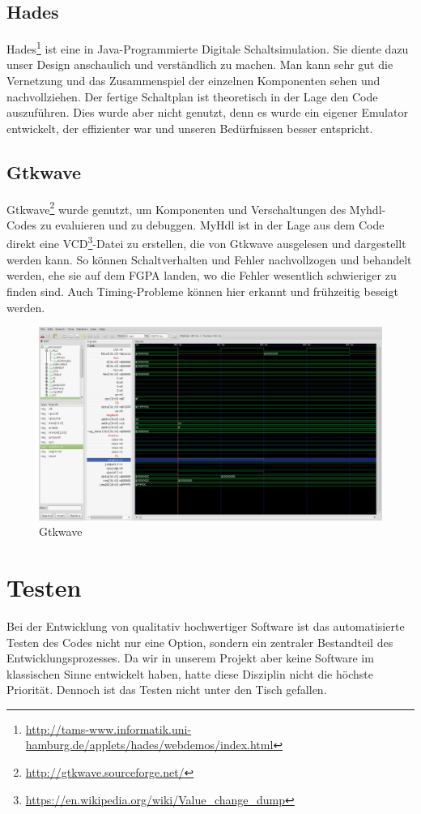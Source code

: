 \subsection{Hades}
Hades\footnote{\url{http://tams-www.informatik.uni-hamburg.de/applets/hades/webdemos/index.html}} ist eine in Java-Programmierte Digitale Schaltsimulation. Sie diente dazu unser Design anschaulich und verständlich zu machen. Man kann sehr gut die Vernetzung und das Zusammenspiel der einzelnen Komponenten sehen und nachvollziehen. Der fertige Schaltplan ist theoretisch in der Lage den Code auszuführen. Dies wurde aber nicht genutzt, denn es wurde ein eigener Emulator entwickelt, der effizienter war und unseren Bedürfnissen besser entspricht.

\subsection{Gtkwave}
Gtkwave\footnote{\url{http://gtkwave.sourceforge.net/}} wurde genutzt, um Komponenten und Verschaltungen des Myhdl-Codes zu evaluieren und zu debuggen. MyHdl ist in der Lage aus dem Code direkt eine VCD\footnote{\url{https://en.wikipedia.org/wiki/Value\_change\_dump}}-Datei zu erstellen, die von Gtkwave ausgelesen und dargestellt werden kann. So können Schaltverhalten und Fehler nachvollzogen und behandelt werden, ehe sie auf dem FGPA landen, wo die Fehler wesentlich schwieriger zu finden sind. Auch Timing-Probleme können hier erkannt und frühzeitig beseigt werden.
\begin{figure}[H]
\centering
\includegraphics[width=\textwidth]{images/gtkwave.png}
\caption{\label{gen:gtkwave}Gtkwave}
\end{figure}

\section{Testen}
Bei der Entwicklung von qualitativ hochwertiger Software ist das automatisierte Testen des Codes nicht nur eine Option, sondern ein zentraler Bestandteil des Entwicklungsprozesses. Da wir in unserem Projekt aber keine Software im klassischen Sinne entwickelt haben, hatte diese Disziplin nicht die höchste Priorität. Dennoch ist das Testen nicht unter den Tisch gefallen. 

